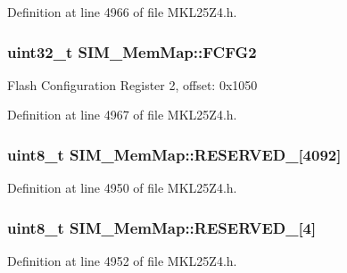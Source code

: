 Definition at line 4966 of file M\+K\+L25\+Z4.\+h.

\subsubsection[{\texorpdfstring{F\+C\+F\+G2}{FCFG2}}]{\setlength{\rightskip}{0pt plus 5cm}uint32\+\_\+t S\+I\+M\+\_\+\+Mem\+Map\+::\+F\+C\+F\+G2}\hypertarget{struct_s_i_m___mem_map_afd105923b2815e01119a5bc195ceebd6}{}\label{struct_s_i_m___mem_map_afd105923b2815e01119a5bc195ceebd6}
Flash Configuration Register 2, offset\+: 0x1050 

Definition at line 4967 of file M\+K\+L25\+Z4.\+h.

\subsubsection[{\texorpdfstring{R\+E\+S\+E\+R\+V\+E\+D\+\_\+0}{RESERVED_0}}]{\setlength{\rightskip}{0pt plus 5cm}uint8\+\_\+t S\+I\+M\+\_\+\+Mem\+Map\+::\+R\+E\+S\+E\+R\+V\+E\+D\+\_\mbox{[}4092\mbox{]}}\hypertarget{struct_s_i_m___mem_map_afaf8190e210f8ed4ae7309c0ef700304}{}\label{struct_s_i_m___mem_map_afaf8190e210f8ed4ae7309c0ef700304}


Definition at line 4950 of file M\+K\+L25\+Z4.\+h.

\subsubsection[{\texorpdfstring{R\+E\+S\+E\+R\+V\+E\+D\+\_\+1}{RESERVED_1}}]{\setlength{\rightskip}{0pt plus 5cm}uint8\+\_\+t S\+I\+M\+\_\+\+Mem\+Map\+::\+R\+E\+S\+E\+R\+V\+E\+D\+\_\mbox{[}4\mbox{]}}\hypertarget{struct_s_i_m___mem_map_ae97b8ef108928032cc6070216fec02ec}{}\label{struct_s_i_m___mem_map_ae97b8ef108928032cc6070216fec02ec}


Definition at line 4952 of file M\+K\+L25\+Z4.\+h.


